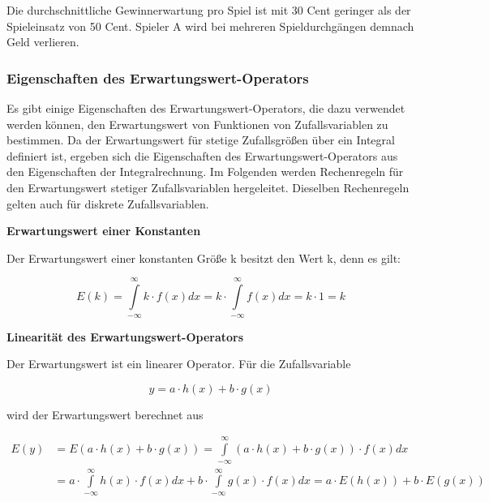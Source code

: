 \noindent Die durchschnittliche Gewinnerwartung pro Spiel ist mit 30 Cent geringer als der Spieleinsatz von 50 Cent. Spieler A wird bei mehreren Spieldurchg\"{a}ngen demnach Geld verlieren.

\subsubsection{Eigenschaften des Erwartungswert-Operators}

\noindent Es gibt einige Eigenschaften des Erwartungswert-Operators, die dazu verwendet werden k\"{o}nnen, den Erwartungswert von Funktionen von Zufallsvariablen zu bestimmen. Da der Erwartungswert f\"{u}r stetige Zufallsgr\"{o}{\ss}en \"{u}ber ein Integral definiert ist, ergeben sich die Eigenschaften des Erwartungswert-Operators aus den Eigenschaften der Integralrechnung. Im Folgenden werden Rechenregeln f\"{u}r den Erwartungswert stetiger Zufallsvariablen hergeleitet. Dieselben Rechenregeln gelten auch f\"{u}r diskrete Zufallsvariablen.\bigskip

{\selectfont
\noindent\textbf{Erwartungswert einer Konstanten}}\smallskip

\noindent Der Erwartungswert einer konstanten Gr\"{o}{\ss}e k besitzt den Wert k, denn es gilt:

\begin{equation}\label{eq:fourtwentyfive}
E(k)=\int\limits _{-\infty }^{\infty }k \cdot f(x)dx=k\cdot \int\limits _{-\infty }^{\infty }f(x) dx =k\cdot 1=k
\end{equation}

{\selectfont
\noindent\textbf{Linearit\"{a}t des Erwartungswert-Operators}}\smallskip

\noindent Der Erwartungswert ist ein linearer Operator. F\"{u}r die Zufallsvariable 

\begin{equation}\label{eq:fourtwentysix}
y=a\cdot h(x)+b\cdot g(x)
\end{equation}

\noindent wird der Erwartungswert berechnet aus

\begin{equation}\label{eq:fourtwentyseven}
\begin{split}
E(y) & = E\left(a\cdot h(x)+b\cdot g(x)\right)=\int\limits _{-\infty }^{\infty }(a\cdot h(x)+b\cdot g(x)) \cdot f(x)dx \\
& = a\cdot \int\limits _{-\infty }^{\infty }h(x) \cdot f(x)dx+b\cdot \int\limits _{-\infty }^{\infty }g(x) \cdot f(x)dx=a\cdot E(h(x))+b\cdot E(g(x))  
\end{split}
\end{equation}

